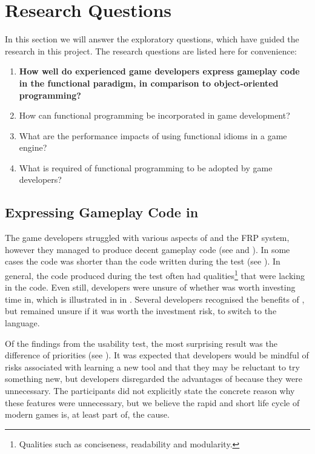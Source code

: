 \section{Research Questions}
In this section we will answer the exploratory questions, which have guided the research in this project. The research questions are listed here for convenience:
\begin{center}
    \begin{enumerate}
        \item \textbf{How well do experienced game developers express gameplay code in the functional paradigm, in comparison to object-oriented programming?}
        \item How can functional programming be incorporated in game development?
        \item What are the performance impacts of using functional idioms in a game engine?
        \item What is required of functional programming to be adopted by game developers?
    \end{enumerate}
\end{center}

\subsection{Expressing Gameplay Code in \fs}
The game developers struggled with various aspects of \fs and the \gls{FRP} system, however they managed to produce decent gameplay code (see  and ). In some cases the \fs code was shorter than the \cs code written during the test (see ). In general, the \fs code produced during the test often had qualities\footnote{Qualities such as conciseness, readability and modularity.} that were lacking in the \cs code. Even still, developers were unsure of whether \fs was worth investing time in, which is illustrated in in . Several developers recognised the benefits of \fs, but remained unsure if it was worth the investment risk, to switch to the language.

Of the findings from the usability test, the most surprising result was the difference of priorities (see ). It was expected that developers would be mindful of risks associated with learning a new tool and that they may be reluctant to try something new, but developers disregarded the advantages of \fs because they were unnecessary. The participants did not explicitly state the concrete reason why these features were unnecessary, but we believe the rapid and short life cycle of modern games is, at least part of, the cause.

